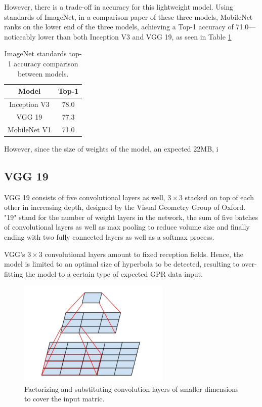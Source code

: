 \documentclass[se,blockletter]{uw-wkrpt}
\begin{document}
However, there is a trade-off in accuracy for this lightweight model. Using standards of ImageNet, in a comparison paper of these three models, MobileNet ranks on the lower end of the three models, achieving a Top-1 accuracy of 71.0---noticeably lower than both Inception V3 and VGG 19, as seen in Table \ref{tbl:top-1-comparison}

\begin{table}
\centering
 \begin{tabular}{|| c c ||} 
 \hline
 Model & Top-1 \\ [0.5ex] 
 \hline\hline
  Inception V3  & 78.0 \\
 \hline
  VGG 19  & 77.3  \\ 
 \hline
  MobileNet V1  & 71.0 \\ [1ex] 
 \hline
\end{tabular}
\caption{ImageNet standards top-1 accuracy comparison between models.}
\label{tbl:top-1-comparison}
\end{table}

However, since the size of weights of the model, an expected 22MB, i

\subsection{VGG 19}
VGG 19 consists of five convolutional layers as well, $3 \times 3$ stacked on top of each other in increasing depth, designed by the Visual Geometry Group of Oxford. "19" stand for the number of weight layers in the network, the sum of five batches of convolutional layers as well as max pooling to reduce volume size and finally ending with two fully connected layers as well as a softmax process.

VGG's $3 \times 3$ convolutional layers amount to fixed reception fields. Hence, the model is limited to an optimal size of hyperbola to be detected, resulting to over-fitting the model to a certain type of expected GPR data input.  

\begin{figure}
  \centering
  \includegraphics[height=5cm]{convolution-substitution}
  \caption{Factorizing and substituting convolution layers of smaller dimensions to cover the input matric.~\cite{ref:}}
  \label{fig:convolution-substitution}
\end{figure}
\end{document}
